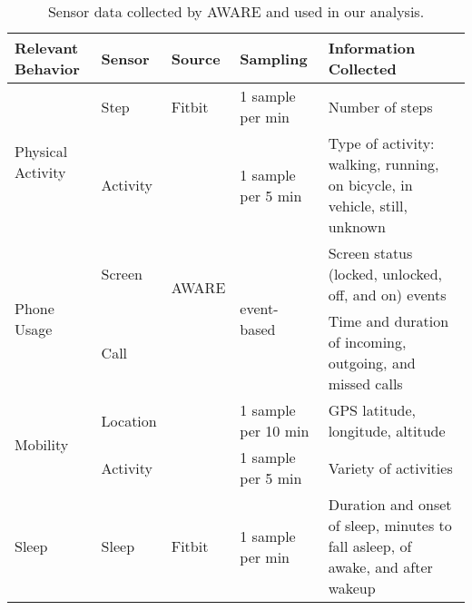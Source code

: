\begin{table}[]
\centering
\smaller
\begin{tabular}{|l|l|l|l|p{5.5cm}|}
\hline
\textbf{Relevant Behavior}         & \textbf{Sensor} & \textbf{Source}        & \textbf{Sampling}            & \textbf{Information Collected}                                                 \\ \hline
\multirow{2}{*}{Physical Activity} & Step            & Fitbit                 & 1 sample per min             & Number of steps                                                                \\ \cline{2-5} 
                                   & Activity        & \multirow{4}{*}{AWARE} & 1 sample per 5 min           & Type of activity: walking, running, on bicycle, in vehicle, still, unknown     \\ \cline{1-2} \cline{4-5} 
\multirow{2}{*}{Phone Usage}                        & Screen          &                        & \multirow{2}{*}{event-based} & Screen status (locked, unlocked, off, and on) events                           \\ \cline{1-2} \cline{5-5} 
\multirow{2}{*}{Social Interactions} & Call            &                        &                              & Time and duration of incoming, outgoing, and missed calls                      \\ \cline{1-2} \cline{4-5} 
\multirow{2}{*}{Mobility}               & Location        &                        & 1 sample per 10 min          & GPS latitude, longitude, altitude                                              \\ \cline{2-2} \cline{4-5}
& Activity & & 1 sample per 5 min & Variety of activities \\ \hline
\multirow{2}{*}{Sleep }                             & Sleep           & Fitbit                 & 1 sample per min             & Duration and onset of sleep, minutes to fall asleep, of awake, and after wakeup \\ \hline
\end{tabular}

\caption[Sensors]{Sensor data collected by AWARE and used in our analysis.}
\label{tab:study-sensors}
\end{table}

